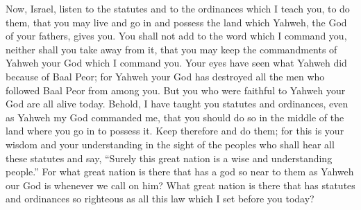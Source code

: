  Now, Israel, listen to the statutes and to the ordinances
which I teach you, to do them, that you may live and go in and possess
the land which Yahweh, the God of your fathers, gives you.
 You shall not add to the word which I command you,
neither shall you take away from it, that you may keep the commandments
of Yahweh your God which I command you.  Your eyes have
seen what Yahweh did because of Baal Peor; for Yahweh your God has
destroyed all the men who followed Baal Peor from among you.
 But you who were faithful to Yahweh your God are all
alive today.  Behold, I have taught you statutes and
ordinances, even as Yahweh my God commanded me, that you should do so in
the middle of the land where you go in to possess it. 
Keep therefore and do them; for this is your wisdom and your
understanding in the sight of the peoples who shall hear all these
statutes and say, ``Surely this great nation is a wise and understanding
people.''  For what great nation is there that has a god
so near to them as Yahweh our God is whenever we call on him?
 What great nation is there that has statutes and
ordinances so righteous as all this law which I set before you today?

